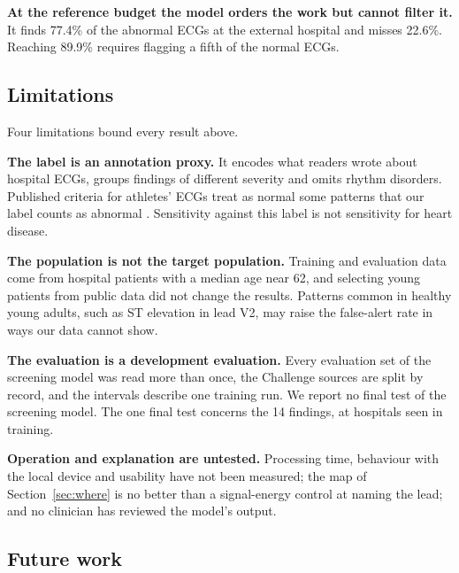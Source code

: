 \documentclass[letterpaper,11pt]{article}
\begin{document}
\textbf{At the reference budget the model orders the work but cannot filter it.} It finds 77.4\% of the abnormal ECGs at the external hospital and misses 22.6\%. Reaching 89.9\% requires flagging a fifth of the normal ECGs.

\subsection{Limitations}

Four limitations bound every result above.

\textbf{The label is an annotation proxy.} It encodes what readers wrote about hospital ECGs, groups findings of different severity and omits rhythm disorders. Published criteria for athletes' ECGs treat as normal some patterns that our label counts as abnormal \parencite{drezner2017international}. Sensitivity against this label is not sensitivity for heart disease.

\textbf{The population is not the target population.} Training and evaluation data come from hospital patients with a median age near 62, and selecting young patients from public data did not change the results. Patterns common in healthy young adults, such as ST elevation in lead V2, may raise the false-alert rate in ways our data cannot show.

\textbf{The evaluation is a development evaluation.} Every evaluation set of the screening model was read more than once, the Challenge sources are split by record, and the intervals describe one training run. We report no final test of the screening model. The one final test concerns the 14 findings, at hospitals seen in training.

\textbf{Operation and explanation are untested.} Processing time, behaviour with the local device and usability have not been measured; the map of Section~\ref{sec:where} is no better than a signal-energy control at naming the lead; and no clinician has reviewed the model's output.

\subsection{Future work}
\end{document}
